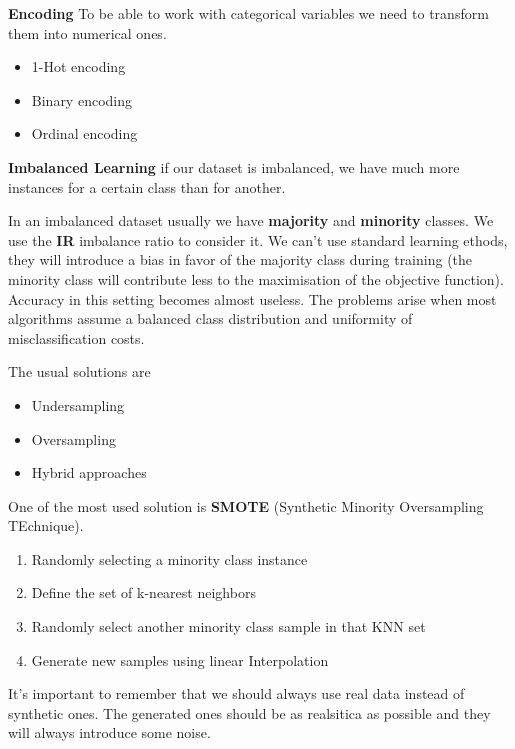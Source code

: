 \textbf{Encoding} \ra To be able to work with categorical variables we need to transform them into numerical ones.

\begin{itemize}
    \item 1-Hot encoding
    \item Binary encoding
    \item Ordinal encoding
\end{itemize}

\textbf{Imbalanced Learning} \ra if our dataset is imbalanced, we have much more instances for a certain class than for another.

\vspace{10pt}

In an imbalanced dataset usually we have \textbf{majority} and \textbf{minority} classes. We use the \textbf{IR} imbalance ratio to consider it. 
We can't use standard learning ethods, they will introduce a bias in favor of the majority class during training (the minority class will contribute less to the maximisation of the objective function).
Accuracy in this setting becomes almost useless. The problems arise when most algorithms assume a balanced class distribution and uniformity of misclassification costs.

\vspace{10pt}

The usual solutions are

\begin{itemize}
    \item Undersampling
    \item Oversampling
    \item Hybrid approaches
\end{itemize}

One of the most used solution is \textbf{SMOTE} (Synthetic Minority Oversampling TEchnique). 

\begin{enumerate}
    \item Randomly selecting a minority class instance
    \item Define the set of k-nearest neighbors
    \item Randomly select another minority class sample in that KNN set
    \item Generate new samples using linear Interpolation
\end{enumerate}

It's important to remember that we should always use real data instead of synthetic ones. The generated ones should be as realsitica as possible and they will always introduce some noise.